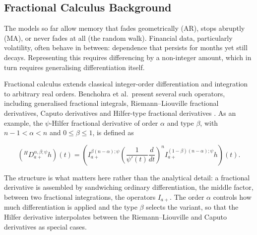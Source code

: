 \documentclass[12pt,a4paper]{article}
\begin{document}
\subsection{Fractional Calculus Background}

The models so far allow memory that fades geometrically (AR), stops abruptly
(MA), or never fades at all (the random walk). Financial data, particularly
volatility, often behave in between: dependence that persists for months yet
still decays. Representing this requires differencing by a non-integer amount,
which in turn requires generalising differentiation itself.

Fractional calculus extends classical integer-order differentiation and
integration to arbitrary real orders. Benchohra et al.\ present several such
operators, including generalised fractional integrals, Riemann--Liouville
fractional derivatives, Caputo derivatives and Hilfer-type fractional
derivatives \cite{Benchohra_2023}. As an example, the $\psi$-Hilfer fractional
derivative of order $\alpha$ and type $\beta$, with $n-1 < \alpha < n$ and
$0 \le \beta \le 1$, is defined as

\begin{equation}
\left({}^{H}D_{a+}^{\alpha,\beta;\psi} h\right)(t) =
\left(I_{a+}^{\beta(n-\alpha);\psi}
\left(\frac{1}{\psi'(t)}\frac{d}{dt}\right)^{n}
I_{a+}^{(1-\beta)(n-\alpha);\psi} h\right)(t).
\end{equation}

The structure is what matters here rather than the analytical detail: a
fractional derivative is assembled by sandwiching ordinary differentiation,
the middle factor, between two fractional integrations, the operators
$I_{a+}$. The order $\alpha$ controls how much differentiation is applied and
the type $\beta$ selects the variant, so that the Hilfer derivative
interpolates between the Riemann--Liouville and Caputo derivatives as special
cases.
\end{document}
